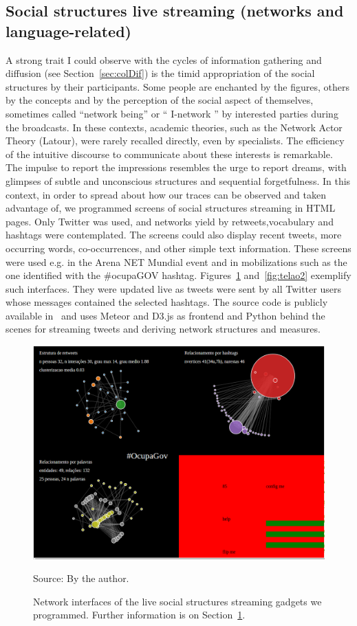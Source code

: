 \begin{apendicesenv}
\section{Social structures live streaming (networks and language-related)}\label{sec:sss}
A strong trait I could observe with the cycles of information gathering and diffusion (see Section~\ref{sec:colDif})
is the timid appropriation of the social structures by their participants.
Some people are enchanted by the figures,
others by the concepts and by the perception of the social aspect of themselves,
sometimes called ``network being'' or `` I-network '' by interested parties during the broadcasts.
In these contexts, academic theories, such as the Network Actor Theory (Latour),
were rarely recalled directly, even by specialists.
The efficiency of the intuitive discourse to communicate about these interests is remarkable.
The impulse to report the impressions resembles the urge to report dreams,
with glimpses of subtle and unconscious structures and sequential forgetfulness.
In this context, in order to spread about how our traces can be observed and taken advantage of,
we programmed screens of social structures streaming in HTML pages.
Only Twitter was used, and networks yield by retweets,vocabulary and hashtags were contemplated.
The screens could also display recent tweets, more occurring words, co-occurrences,
and other simple text information.
These screens were used e.g. in the Arena NET Mundial event
and in mobilizations such as the one identified with the \#ocupaGOV hashtag.
Figures~\ref{fig:telao1} and~\ref{fig:telao2} exemplify such interfaces.
They were updated live as tweets were sent by all Twitter users whose messages
contained the selected hashtags.
The source code is publicly available in~\cite{teloes} and uses Meteor and D3.js as frontend and
Python behind the scenes for streaming tweets and deriving network structures and measures.

\begin{figure}[H]
  \centering
    \includegraphics[width=.85\textwidth]{figs/telao1.png}
  \caption{Network interfaces of the live social structures streaming gadgets we programmed.
	Further information is on Section~\ref{sec:sss}.}\label{fig:telao1}
\begin{flushleft}\footnotesize
Source: By the author.\
\end{flushleft}
\end{figure}


\end{apendicesenv}
